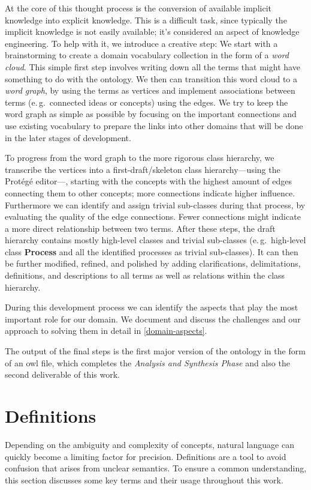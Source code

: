 \documentclass[a4paper, DIV=13, BCOR=0cm]{scrbook}
\newcommand{\eg}{e.\,g.\ }
\begin{document}
At the core of this thought process is the conversion of available implicit knowledge into explicit knowledge. This is a difficult task, since typically the implicit knowledge is not easily available; it's considered an aspect of knowledge engineering. \cite[p.\,30--31]{moore2011towards} To help with it, we introduce a creative step: We start with a brainstorming to create a domain vocabulary collection in the form of a \textit{word cloud}. This simple first step involves writing down all the terms that might have something to do with the ontology. We then can transition this word cloud to a \textit{word graph}, by using the terms as vertices and implement associations between terms (\eg connected ideas or concepts) using the edges. We try to keep the word graph as simple as possible by focusing on the important connections and use existing vocabulary to prepare the links into other domains that will be done in the later stages of development.

To progress from the word graph to the more rigorous class hierarchy, we transcribe the vertices into a first-draft/skeleton class hierarchy---using the Protégé editor---, starting with the concepts with the highest amount of edges connecting them to other concepts; more connections indicate higher influence. Furthermore we can identify and assign trivial sub-classes during that process, by evaluating the quality of the edge connections. Fewer connections might indicate a more direct relationship between two terms. After these steps, the draft hierarchy contains mostly high-level classes and trivial sub-classes (\eg high-level class \textbf{Process} and all the identified processes as trivial sub-classes). It can then be further modified, refined, and polished by adding clarifications, delimitations, definitions, and descriptions to all terms as well as relations within the class hierarchy.

During this development process we can identify the aspects that play the most important role for our domain. We document and discuss the challenges and our approach to solving them in detail in \autoref{domain-aspects}.

The output of the final steps is the first major version of the ontology in the form of an \gls{owl} file, which completes the \textit{Analysis and Synthesis Phase} and also the second deliverable of this work.

\section{Definitions }
\label{definitions}
Depending on the ambiguity and complexity of concepts, natural language can quickly become a limiting factor for precision. Definitions are a tool to avoid confusion that arises from unclear semantics. To ensure a common understanding, this section discusses some key terms and their usage throughout this work.
\end{document}
